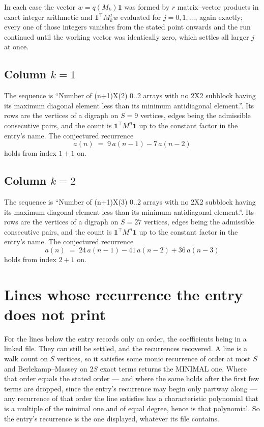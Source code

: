 \documentclass[11pt,a4paper]{article}
\theoremstyle{plain}
\theoremstyle{definition}
\begin{document}
In each case the vector $w=q(M_k)\mathbf{1}$ was formed by $r$ matrix--vector products in
exact integer arithmetic and $\mathbf{1}^{\!\top}M_k^{j}w$ evaluated for $j=0,1,\dots$,
again exactly; every one of those integers vanishes from the stated point onwards and the run
continued until the working vector was identically zero, which settles all larger $j$ at once.

\subsection*{Column $k$$=1$}
The sequence is ``Number of (n+1)X(2) 0..2 arrays with no 2X2 subblock having its maximum diagonal element less than its minimum antidiagonal element.''. Its rows are the vertices of a digraph on
$S=9$ vertices, edges being the admissible consecutive pairs, and the count is
$\mathbf{1}^{\!\top}M^{n}\mathbf{1}$ up to the constant factor in the entry's name.
The conjectured recurrence
\[
a(n)\;=\;9\,a(n-1) - 7\,a(n-2)
\]
holds from index $1+1$ on.

\subsection*{Column $k$$=2$}
The sequence is ``Number of (n+1)X(3) 0..2 arrays with no 2X2 subblock having its maximum diagonal element less than its minimum antidiagonal element.''. Its rows are the vertices of a digraph on
$S=27$ vertices, edges being the admissible consecutive pairs, and the count is
$\mathbf{1}^{\!\top}M^{n}\mathbf{1}$ up to the constant factor in the entry's name.
The conjectured recurrence
\[
a(n)\;=\;24\,a(n-1) - 41\,a(n-2) + 36\,a(n-3)
\]
holds from index $2+1$ on.


\section{Lines whose recurrence the entry does not print}

For the lines below the entry records only an order, the coefficients being in a linked file.
They can still be settled, and the recurrences recovered. A line is a walk count on $S$
vertices, so it satisfies some monic recurrence of order at most $S$ and Berlekamp--Massey on
$2S$ exact terms returns the MINIMAL one. Where that order equals the stated order --- and
where the same holds after the first few terms are dropped, since the entry's recurrence may
begin only partway along --- any recurrence of that order the line satisfies has a
characteristic polynomial that is a multiple of the minimal one and of equal degree, hence is
that polynomial. So the entry's recurrence is the one displayed, whatever its file contains.
\end{document}
